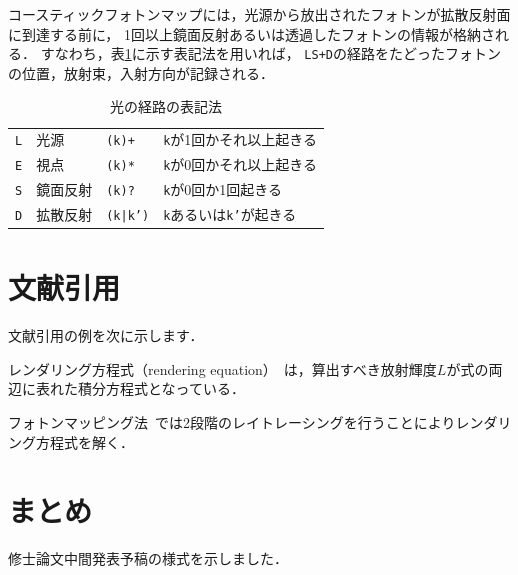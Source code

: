 \documentclass[10pt, a4paper, twocolumn]{jarticle}
\begin{document}
コースティックフォトンマップには，光源から放出されたフォトンが拡散反射面に到達する前に，
1回以上鏡面反射あるいは透過したフォトンの情報が格納される．
すなわち，表\ref{tab:path_notation}に示す表記法を用いれば，
{\tt LS+D}の経路をたどったフォトンの位置，放射束，入射方向が記録される．
%
\begin{table}[t]
  \begin{center}
  \caption{光の経路の表記法}
  \label{tab:path_notation}
  \begin{tabular}{l l | l l} \toprule
    {\tt L} & 光源 & {\tt (k)+} & {\tt k}が1回かそれ以上起きる \\ 
    {\tt E} & 視点 & {\tt (k)*} & {\tt k}が0回かそれ以上起きる \\
    {\tt S} & 鏡面反射 & {\tt (k)?} & {\tt k}が0回か1回起きる \\ 
    {\tt D} & 拡散反射 & {\tt (k|k')} & {\tt k}あるいは{\tt k'}が起きる \\ \bottomrule
  \end{tabular}
  \end{center}
\end{table}
%
\newline

\section{文献引用}
文献引用の例を次に示します．
\newline

レンダリング方程式（rendering equation）~\cite{kajiya1986rendering}は，算出すべき放射輝度$L$が式の両辺に表れた積分方程式となっている．

フォトンマッピング法~\cite{jensen2001realistic}では2段階のレイトレーシングを行うことによりレンダリング方程式を解く．


\section{まとめ}
修士論文中間発表予稿の様式を示しました．


    
\end{document}
